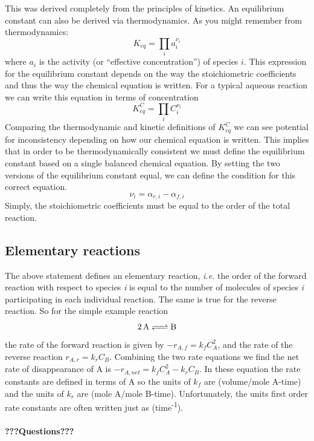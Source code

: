 \documentclass[
]{article}
\begin{document}
This was derived completely from the principles of kinetics. An equilibrium constant can also be derived via thermodynamics. As you might remember from thermodynamics:
\[K_{eq} = \prod_i a_i^{\nu_i}\]
where \(a_i\) is the activity (or ``effective concentration'') of species \(i\). This expression for the equilibrium constant depends on the way the stoichiometric coefficients and thus the way the chemical equation is written. For a typical aqueous reaction we can write this equation in terms of concentration
\[K_{eq}^C=\prod_iC_i^{\nu_i}\]
Comparing the thermodynamic and kinetic definitions of \(K_{eq}^C\) we can see potential for inconsistency depending on how our chemical equation is written. This implies that in order to be thermodynamically consistent we must define the equilibrium constant based on a single balanced chemical equation. By setting the two versions of the equilibrium constant equal, we can define the condition for this correct equation.
\[\nu_i = \alpha_{r,i} - \alpha_{f,i}\]
Simply, the stoichiometric coefficients must be equal to the order of the total reaction.

\hypertarget{elementary-reactions}{%
\subsection{Elementary reactions}\label{elementary-reactions}}

The above statement defines an elementary reaction, \emph{i.e.} the order of the forward reaction with respect to species \emph{i} is equal to the number of molecules of species \emph{i} participating in each individual reaction. The same is true for the reverse reaction. So for the simple example reaction
\[ \ce{2A <=> B} \]
the rate of the forward reaction is given by \(-r_{A,f} = k_f C_A^2\), and the rate of the reverse reaction \(r_{A,r} = k_r C_B\). Combining the two rate equations we find the net rate of disappearance of A is \(-r_{A,net}=k_f C_A^2 - k_r C_B\). In these equation the rate constants are defined in terms of A so the units of \(k_f\) are (volume/mole A-time) and the units of \(k_r\) are (mole A/mole B-time). Unfortunately, the units first order rate constants are often written just as (time\textsuperscript{-1}).

\hypertarget{questions-2}{%
\paragraph{???Questions???}\label{questions-2}}
\end{document}
